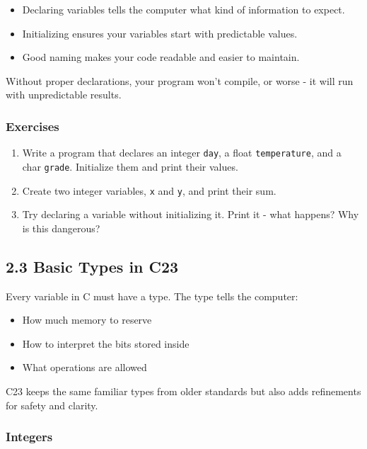 \documentclass[
  letterpaper,
  DIV=11,
  numbers=noendperiod]{scrreprt}
\providecommand{\tightlist}{%
  \setlength{\itemsep}{0pt}\setlength{\parskip}{0pt}}
\begin{document}
\begin{itemize}
\tightlist
\item
  Declaring variables tells the computer what kind of information to
  expect.
\item
  Initializing ensures your variables start with predictable values.
\item
  Good naming makes your code readable and easier to maintain.
\end{itemize}

Without proper declarations, your program won't compile, or worse - it
will run with unpredictable results.

\subsubsection{Exercises}\label{exercises-6}

\begin{enumerate}
\def\labelenumi{\arabic{enumi}.}
\tightlist
\item
  Write a program that declares an integer \texttt{day}, a float
  \texttt{temperature}, and a char \texttt{grade}. Initialize them and
  print their values.
\item
  Create two integer variables, \texttt{x} and \texttt{y}, and print
  their sum.
\item
  Try declaring a variable without initializing it. Print it - what
  happens? Why is this dangerous?
\end{enumerate}

\subsection{2.3 Basic Types in C23}\label{basic-types-in-c23}

Every variable in C must have a type. The type tells the computer:

\begin{itemize}
\tightlist
\item
  How much memory to reserve
\item
  How to interpret the bits stored inside
\item
  What operations are allowed
\end{itemize}

C23 keeps the same familiar types from older standards but also adds
refinements for safety and clarity.

\subsubsection{Integers}\label{integers}
\end{document}

